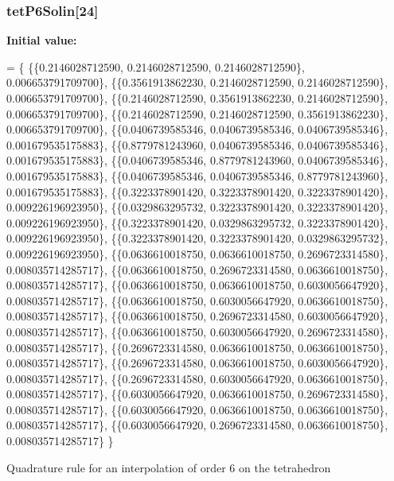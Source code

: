 \subsubsection[{tet\-P6\-Solin}]{ tet\-P6\-Solin[24]}\label{GaussQuadratureTet_8cc_ae88e8080e20ca4adca11fbebce3a9211}
{\bfseries Initial value\-:}
\begin{DoxyCode}
= \{
  \{\{0.2146028712590, 0.2146028712590, 0.2146028712590\}, 0.006653791709700\},
  \{\{0.3561913862230, 0.2146028712590, 0.2146028712590\}, 0.006653791709700\},
  \{\{0.2146028712590, 0.3561913862230, 0.2146028712590\}, 0.006653791709700\},
  \{\{0.2146028712590, 0.2146028712590, 0.3561913862230\}, 0.006653791709700\},
  \{\{0.0406739585346, 0.0406739585346, 0.0406739585346\}, 0.001679535175883\},
  \{\{0.8779781243960, 0.0406739585346, 0.0406739585346\}, 0.001679535175883\},
  \{\{0.0406739585346, 0.8779781243960, 0.0406739585346\}, 0.001679535175883\},
  \{\{0.0406739585346, 0.0406739585346, 0.8779781243960\}, 0.001679535175883\},
  \{\{0.3223378901420, 0.3223378901420, 0.3223378901420\}, 0.009226196923950\},
  \{\{0.0329863295732, 0.3223378901420, 0.3223378901420\}, 0.009226196923950\},
  \{\{0.3223378901420, 0.0329863295732, 0.3223378901420\}, 0.009226196923950\},
  \{\{0.3223378901420, 0.3223378901420, 0.0329863295732\}, 0.009226196923950\},
  \{\{0.0636610018750, 0.0636610018750, 0.2696723314580\}, 0.008035714285717\},
  \{\{0.0636610018750, 0.2696723314580, 0.0636610018750\}, 0.008035714285717\},
  \{\{0.0636610018750, 0.0636610018750, 0.6030056647920\}, 0.008035714285717\},
  \{\{0.0636610018750, 0.6030056647920, 0.0636610018750\}, 0.008035714285717\},
  \{\{0.0636610018750, 0.2696723314580, 0.6030056647920\}, 0.008035714285717\},
  \{\{0.0636610018750, 0.6030056647920, 0.2696723314580\}, 0.008035714285717\},
  \{\{0.2696723314580, 0.0636610018750, 0.0636610018750\}, 0.008035714285717\},
  \{\{0.2696723314580, 0.0636610018750, 0.6030056647920\}, 0.008035714285717\},
  \{\{0.2696723314580, 0.6030056647920, 0.0636610018750\}, 0.008035714285717\},
  \{\{0.6030056647920, 0.0636610018750, 0.2696723314580\}, 0.008035714285717\},
  \{\{0.6030056647920, 0.0636610018750, 0.0636610018750\}, 0.008035714285717\},
  \{\{0.6030056647920, 0.2696723314580, 0.0636610018750\}, 0.008035714285717\}
\}
\end{DoxyCode}
Quadrature rule for an interpolation of order 6 on the tetrahedron 
